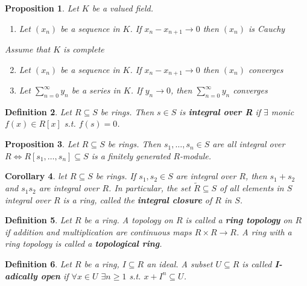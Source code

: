 \documentclass[a4paper]{article}
\newtheorem{definition}{Definition}
\newtheorem{prop}[definition]{Proposition}
\newtheorem{corollary}[definition]{Corollary}
\begin{document}
\begin{prop}
	Let $K$ be a valued field.
	\begin{enumerate}[label=\roman*.]
		\item Let $(x_n)$ be a sequence in $K$. If $x_n - x_{n+1} \to 0$ then $(x_n)$ is Cauchy
	\end{enumerate}
	Assume that $K$ is complete
	\begin{enumerate}[label=\roman*.]
		\setcounter{enumi}{1}
		\item Let $(x_n)$ be a sequence in $K$. If $x_n - x_{n+1} \to 0$ then $(x_n)$ converges
		\item Let $\sum_{n=0}^{\infty}y_n$ be a series in $K$. If $y_n\to0$, then $\sum_{n=0}^{\infty}y_n$ converges
	\end{enumerate}
\end{prop}

\begin{definition}
	Let $R \subseteq S$ be rings. Then $s \in S$ is \textbf{integral over R} if $\exists$ monic $f(x) \in R[x]$ s.t. $f(s)=0$.
\end{definition}

\begin{prop}
	Let $R \subseteq S$ be rings. Then $s_1, \dots,s_n\in S$ are all integral over $R \iff R[s_1,\dots,s_n] \subseteq S$ is a finitely generated $R$-module.
\end{prop}

\begin{corollary}
	let $R \subseteq S$ be rings. If $s_1, s_2 \in S$ are integral over $R$, then $s_1+s_2$ and $s_1s_2$ are integral over $R$. In particular, the set $\tilde{R}\subseteq S$ of all elements in $S$ integral over $R$ is a ring, called the \textbf{integral closure} of $R$ in $S$.
\end{corollary}

\begin{definition}
	Let $R$ be a ring. A topology on $R$ is called a \textbf{ring topology} on $R$ if addition and multiplication are continuous maps $R\times R\to R$. A ring with a ring topology is called a \textbf{topological ring}.
\end{definition}

\begin{definition}
	Let $R$ be a ring, $I \subseteq R$ an ideal. A subset $U \subseteq R$ is called \linebreak \textbf{I-adically open} if $\forall x \in U$ $\exists n \geq 1$ s.t. $x + I^n \subseteq U$.
\end{definition}
\end{document}
